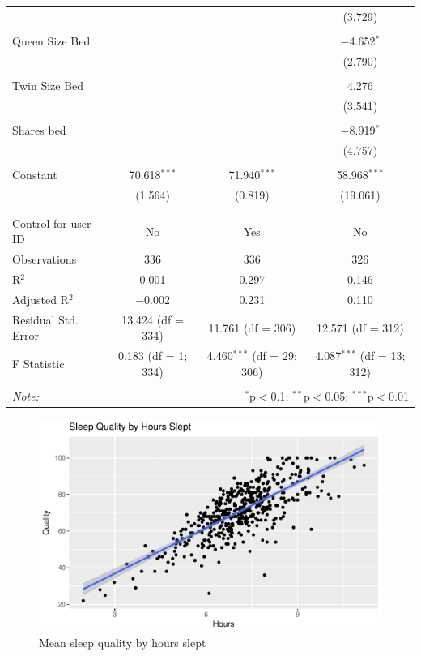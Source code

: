 \documentclass[]{article}
\begin{document}
\begin{table}[!htbp]
\begin{tabular}{@{\extracolsep{5pt}}lccc}
  &  &  & (3.729) \\ 
  & & & \\ 
 Queen Size Bed &  &  & $-$4.652$^{*}$ \\ 
  &  &  & (2.790) \\ 
  & & & \\ 
 Twin Size Bed &  &  & 4.276 \\ 
  &  &  & (3.541) \\ 
  & & & \\ 
 Shares bed &  &  & $-$8.919$^{*}$ \\ 
  &  &  & (4.757) \\ 
  & & & \\ 
 Constant & 70.618$^{***}$ & 71.940$^{***}$ & 58.968$^{***}$ \\ 
  & (1.564) & (0.819) & (19.061) \\ 
  & & & \\ 
\hline \\[-1.8ex] 
Control for user ID & No & Yes & No \\ 
Observations & 336 & 336 & 326 \\ 
R$^{2}$ & 0.001 & 0.297 & 0.146 \\ 
Adjusted R$^{2}$ & $-$0.002 & 0.231 & 0.110 \\ 
Residual Std. Error & 13.424 (df = 334) & 11.761 (df = 306) & 12.571 (df = 312) \\ 
F Statistic & 0.183 (df = 1; 334) & 4.460$^{***}$ (df = 29; 306) & 4.087$^{***}$ (df = 13; 312) \\ 
\hline 
\hline \\[-1.8ex] 
\textit{Note:}  & \multicolumn{3}{r}{$^{*}$p$<$0.1; $^{**}$p$<$0.05; $^{***}$p$<$0.01} \\ 
\end{tabular} 
\end{table}

\begin{figure}
\centering
\includegraphics{report_files/figure-latex/quality_by_hours_fig-1.pdf}
\caption{\label{fig:quality_by_hours_fig} Mean sleep quality by hours
slept}
\end{figure}
\end{document}
